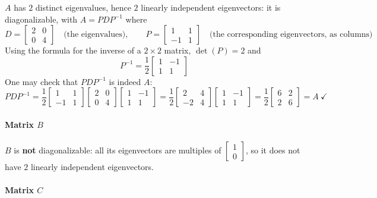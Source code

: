 \documentclass[]{article}
\begin{document}
	$A$ has $2$ distinct eigenvalues, hence $2$ linearly independent eigenvectors: it is diagonalizable, with $A = P D P^{-1}$ where
	$$D = \begin{bmatrix} 2 & 0 \\ 0 & 4 \end{bmatrix} \quad \text{(the eigenvalues)}, \qquad
	P = \begin{bmatrix} 1 & 1 \\ -1 & 1 \end{bmatrix} \quad \text{(the corresponding eigenvectors, as columns)}$$
	Using the formula for the inverse of a $2 \times 2$ matrix, $\det(P) = 2$ and
	$$P^{-1} = \frac{1}{2} \begin{bmatrix} 1 & -1 \\ 1 & 1 \end{bmatrix}$$
	One may check that $P D P^{-1}$ is indeed $A$:
	$$P D P^{-1} = \frac{1}{2}\begin{bmatrix} 1 & 1 \\ -1 & 1 \end{bmatrix} \begin{bmatrix} 2 & 0 \\ 0 & 4 \end{bmatrix} \begin{bmatrix} 1 & -1 \\ 1 & 1 \end{bmatrix}
	= \frac{1}{2}\begin{bmatrix} 2 & 4 \\ -2 & 4 \end{bmatrix} \begin{bmatrix} 1 & -1 \\ 1 & 1 \end{bmatrix}
	= \frac{1}{2}\begin{bmatrix} 6 & 2 \\ 2 & 6 \end{bmatrix} = A \ \checkmark$$

	\paragraph{Matrix $B$}\mbox{}

	$B$ is \textbf{not} diagonalizable: all its eigenvectors are multiples of $\begin{bmatrix} 1 \\ 0 \end{bmatrix}$, so it does not have $2$ linearly independent eigenvectors.

	\paragraph{Matrix $C$}\mbox{}
\end{document}
